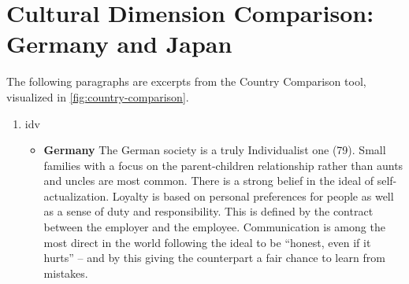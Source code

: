 \appendix

\section{Cultural Dimension Comparison: Germany and Japan}
\label{sec:appendix-country-comparison-tool-descriptions}

The following paragraphs are excerpts from the Country Comparison tool, visualized in \cref{fig:country-comparison}.

\begin{enumerate}

    \item \ac{idv}
    \begin{itemize}
        \item \textbf{Germany}
        The German society is a truly Individualist one (79).
        Small families with a focus on the parent-children relationship rather than aunts and uncles are most common.
        There is a strong belief in the ideal of self-actualization.
        Loyalty is based on personal preferences for people as well as a sense of duty and responsibility.
        This is defined by the contract between the employer and the employee.
        Communication is among the most direct in the world following the ideal to be “honest, even if it hurts” – and by this giving the counterpart a fair chance to learn from mistakes.


\end{itemize}
\end{enumerate}
